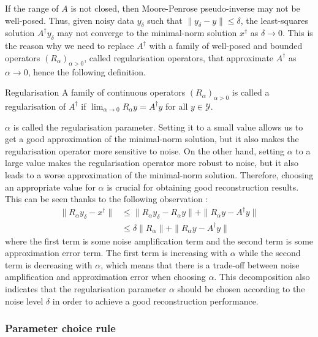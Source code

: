 If the range of $A$ is not closed, then Moore-Penrose pseudo-inverse may not be well-posed.
Thus, given noisy data $y_\delta$ such that $\| y_\delta - y \| \leq \delta$, the least-squares solution $A^\dagger y_\delta$ may not converge to the minimal-norm solution $x^\dagger$ as $\delta \to 0$.
This is the reason why we need to replace $A^\dagger$ with a family of well-posed and bounded operators $(R_\alpha)_{\alpha > 0}$, called regularisation operators, that approximate $A^\dagger$ as $\alpha \to 0$, hence the following definition.

\begin{definition}{Regularisation}
    A family of continuous operators $(R_\alpha)_{\alpha > 0}$ is called a regularisation of $A^\dagger$ if $\lim_{\alpha \to 0} R_\alpha y = A^\dagger y$ for all $y \in \mathcal{Y}$.
\end{definition}

$\alpha$ is called the regularisation parameter. Setting it to a small value allows us to get a good approximation of the minimal-norm solution, but it also makes the regularisation operator more sensitive to noise. On the other hand, setting $\alpha$ to a large value makes the regularisation operator more robust to noise, but it also leads to a worse approximation of the minimal-norm solution. Therefore, choosing an appropriate value for $\alpha$ is crucial for obtaining good reconstruction results.
This can be seen thanks to the following observation :
\begin{equation*}
    \begin{aligned}
        \| R_\alpha y_\delta - x^\dagger \| &\leq \| R_\alpha y_\delta - R_\alpha y \| + \| R_\alpha y - A^\dagger y \| \\
        & \leq \delta \| R_\alpha \| + \| R_\alpha y - A^\dagger y \|
    \end{aligned}
\end{equation*}
where the first term is some noise amplification term and the second term is some approximation error term. The first term is increasing with $\alpha$ while the second term is decreasing with $\alpha$, which means that there is a trade-off between noise amplification and approximation error when choosing $\alpha$.
This decomposition also indicates that the regularisation parameter $\alpha$ should be chosen according to the noise level $\delta$ in order to achieve a good reconstruction performance.

\subsubsection{Parameter choice rule}

